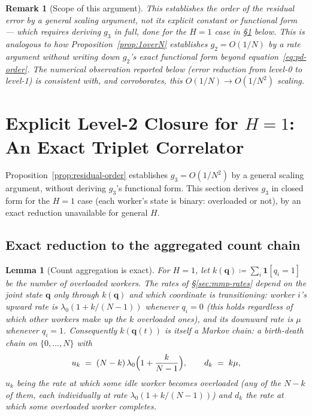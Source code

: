 \documentclass[11pt,a4paper]{report}
\newtheorem{lemma}[theorem]{Lemma}
\newtheorem{remark}{Remark}[section]
\begin{document}
\begin{remark}[Scope of this argument]
This establishes the \emph{order} of the residual error by a general
scaling argument, not its explicit constant or functional form ---
which requires deriving $g_3$ in full, done for the $H=1$ case in
\S\ref{sec:level2-explicit} below. This is analogous to how
Proposition~\ref{prop:1overN} establishes $g_2 = O(1/N)$ by a rate
argument without writing down $g_2$'s exact functional form beyond
equation~\eqref{eq:pd-order}. The numerical observation reported below
(error reduction from level-0 to level-1) is consistent with, and
corroborates, this $O(1/N) \to O(1/N^2)$ scaling.
\end{remark}

\section{Explicit Level-2 Closure for $H=1$: An Exact Triplet Correlator}
\label{sec:level2-explicit}

Proposition~\ref{prop:residual-order} establishes $g_3 = O(1/N^2)$ by
a general scaling argument, without deriving $g_3$'s functional form.
This section derives $g_3$
in closed form for the $H=1$ case (each worker's state is binary:
overloaded or not), by an exact reduction unavailable for general $H$.

\subsection{Exact reduction to the aggregated count chain}

\begin{lemma}[Count aggregation is exact]
\label{lem:count-exact}
For $H=1$, let $k(\mathbf{q}) \coloneqq \sum_i \mathbf{1}[q_i = 1]$ be
the number of overloaded workers. The rates of
\S\ref{sec:mmp-rates} depend on the joint state $\mathbf{q}$ only
through $k(\mathbf{q})$ and which coordinate is transitioning:
worker $i$'s upward rate is $\lambda_0(1 + k/(N-1))$ whenever $q_i=0$
(this holds regardless of which other workers make up the $k$
overloaded ones), and its downward rate is $\mu$ whenever $q_i=1$.
Consequently $k(\mathbf{q}(t))$ is itself a Markov chain: a birth-death
chain on $\{0,\ldots,N\}$ with
\[
  u_k \;=\; (N-k)\,\lambda_0\Bigl(1 + \frac{k}{N-1}\Bigr),
  \qquad
  d_k \;=\; k\mu,
\]
$u_k$ being the rate at which \emph{some} idle worker becomes
overloaded (any of the $N-k$ of them, each individually at rate
$\lambda_0(1+k/(N-1))$) and $d_k$ the rate at which some overloaded
worker completes.
\end{lemma}
\end{document}
